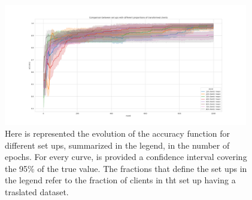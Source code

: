 \documentclass{article} %
\newcounter{late}
\begin{document}
\begin{figure}[!hb]
    \centering
        \includegraphics[width=0.95\textwidth, keepaspectratio]{images/accuracy_red_TL1.png}
    \caption{Here is represented the evolution of the accuracy function for different set ups, 
    summarized in the legend, in the number of epochs. For every curve, is provided a confidence 
    interval covering the 95\% of the true value. The fractions that define the set ups in the 
    legend refer to the fraction of clients in tht set up having a traslated dataset.}
    \label{fig11}
\end{figure}





\newpage



\renewcommand\thefigure{\thesection.\arabic{figure}}
\end{document}
